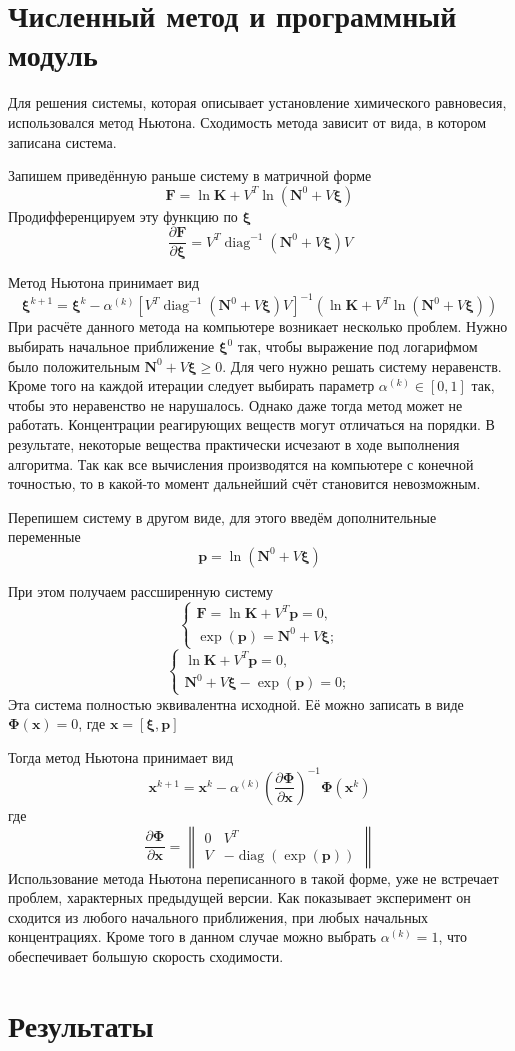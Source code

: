 \documentclass[12pt,a4paper]{article}
\newcommand{\pd}[2]{\frac{\partial #1}{\partial #2}}
\newcommand{\diag}{\operatorname{diag}}
\renewcommand{\vec}[1]{\boldsymbol{\mathbf{#1}}}
\renewcommand{\geq}{\geqslant}
\begin{document}
\section{Численный метод и программный модуль}

Для решения системы, которая описывает установление химического равновесия, использовался метод Ньютона. Сходимость метода зависит от вида, в котором записана система.

Запишем приведённую раньше систему в матричной форме$$\vec{F} = \ln{\vec{K}} + V^T \ln{(\vec{N}^0 + V\vec \xi)}$$
Продифференцируем эту функцию по $\vec \xi$
$$\frac{\partial \vec{F}}{\partial{\vec{\xi}}} = V^T\diag^{-1}(\vec{N}^0 + V\vec{\xi})V$$

Метод Ньютона принимает вид
$$\vec{\xi}^{k+1} = \vec{\xi}^{k} - \alpha^{(k)}[V^T\diag^{-1}(\vec{N}^0 + V\vec{\xi})V]^{-1}(\ln{\vec{K}} + V^T \ln{(\vec{N}^0 + V\vec{\xi})})$$
При расчёте данного метода на компьютере возникает несколько проблем. Нужно выбирать начальное приближение $\vec{\xi}^0$ так, чтобы выражение под логарифмом было положительным $\vec{N}^0 + V\vec{\xi}\geq 0$. Для чего нужно решать систему неравенств. Кроме того на каждой итерации следует выбирать параметр $\alpha^{(k)} \in [0,1]$ так, чтобы это неравенство не нарушалось. Однако даже тогда метод может не работать. Концентрации реагирующих веществ могут отличаться на порядки. В результате, некоторые вещества практически исчезают в ходе выполнения алгоритма. Так как все вычисления производятся на компьютере с конечной точностью, то в какой-то момент дальнейший счёт становится невозможным.

Перепишем систему в другом виде, для этого введём дополнительные переменные $$\vec{p} = \ln{(\vec{N}^0 + V\vec{\xi})}$$ 

При этом получаем рассширенную систему
$$\begin{cases} 
	\vec{F} = \ln{\vec{K}} + V^T\vec{p}=0,\\
	\exp(\vec{p})=\vec{N}^0 + V\vec{\xi};
	
\end{cases}$$
$$\begin{cases} 
	\ln{\vec{K}} + V^T\vec{p}=0,\\
	\vec{N}^0 + V\vec{\xi} - \exp(\vec{p}) = 0;
\end{cases}$$
Эта система полностью эквивалентна исходной. Её можно записать в виде
$\vec{\Phi}(\vec{x}) = 0$, где $ \vec{x} = [\vec{\xi}, \vec{p}]$

Тогда метод Ньютона принимает вид\\
$$\vec{x}^{k+1} = \vec{x}^{k} - \alpha^{(k)}\left(\pd{\vec{\Phi}}{\vec{x}}\right)^{-1}\vec{\Phi}(\vec x^k)$$
 где $$\pd{\vec{\Phi}}{\vec{x}} = \begin{Vmatrix}
 0 & V^T \\
 V & -\diag({\exp(\vec{p})})
\end{Vmatrix}  $$
Использование метода Ньютона переписанного в такой форме, уже не встречает проблем, характерных предыдущей версии. Как показывает эксперимент он сходится из любого начального приближения, при любых начальных концентрациях. Кроме того в данном случае можно выбрать $\alpha^{(k)} = 1$, что обеспечивает большую скорость сходимости.

\section{Результаты}
\end{document}
